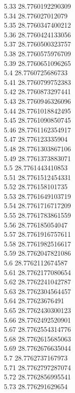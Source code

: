 {5.33	28.7760192290309\\
5.34	28.776027012079\\
5.35	28.7760347400212\\
5.36	28.7760424133056\\
5.37	28.7760500323757\\
5.38	28.7760575976709\\
5.39	28.7760651096265\\
5.4	28.7760725686733\\
5.41	28.7760799752383\\
5.42	28.7760873297441\\
5.43	28.7760946326096\\
5.44	28.7761018842495\\
5.45	28.7761090850745\\
5.46	28.7761162354917\\
5.47	28.776123335904\\
5.48	28.7761303867106\\
5.49	28.7761373883071\\
5.5	28.7761443410853\\
5.51	28.7761512454331\\
5.52	28.776158101735\\
5.53	28.7761649103719\\
5.54	28.7761716717209\\
5.55	28.7761783861559\\
5.56	28.776185054047\\
5.57	28.7761916757611\\
5.58	28.7761982516617\\
5.59	28.7762047821086\\
5.6	28.7762112674587\\
5.61	28.7762177080654\\
5.62	28.7762241042787\\
5.63	28.7762304564457\\
5.64	28.77623676491\\
5.65	28.7762430300123\\
5.66	28.7762492520901\\
5.67	28.7762554314776\\
5.68	28.7762615685063\\
5.69	28.7762676635044\\
5.7	28.7762737167973\\
5.71	28.7762797287074\\
5.72	28.7762856995541\\
5.73	28.776291629654\\
}
